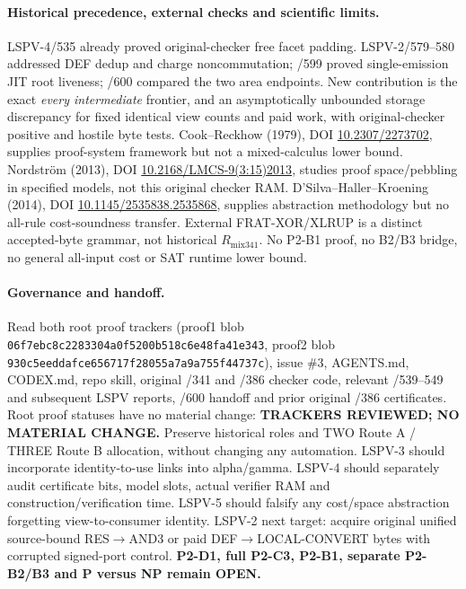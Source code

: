 \documentclass[11pt]{article}
\begin{document}
\paragraph{Historical precedence, external checks and scientific limits.}
LSPV-4/535 already proved original-checker free facet padding. LSPV-2/579--580 addressed DEF dedup and charge noncommutation; /599 proved single-emission JIT root liveness; /600 compared the two area endpoints. New contribution is the exact \emph{every intermediate} frontier, and an asymptotically unbounded storage discrepancy for fixed identical view counts and paid work, with original-checker positive and hostile byte tests. Cook--Reckhow (1979), DOI \href{https://doi.org/10.2307/2273702}{10.2307/2273702}, supplies proof-system framework but not a mixed-calculus lower bound. Nordstr\"om (2013), DOI \href{https://doi.org/10.2168/LMCS-9(3:15)2013}{10.2168/LMCS-9(3:15)2013}, studies proof space/pebbling in specified models, not this original checker RAM. D'Silva--Haller--Kroening (2014), DOI \href{https://doi.org/10.1145/2535838.2535868}{10.1145/2535838.2535868}, supplies abstraction methodology but no all-rule cost-soundness transfer. External FRAT-XOR/XLRUP is a distinct accepted-byte grammar, not historical $R_{\mathrm{mix341}}$. No P2-B1 proof, no B2/B3 bridge, no general all-input cost or SAT runtime lower bound.

\paragraph{Governance and handoff.}
Read both root proof trackers (proof1 blob \texttt{06f7ebc8c2283304a0f5200b518c6e48fa41e343}, proof2 blob \texttt{930c5eeddafce656717f28055a7a9a755f44737c}), issue \#3, AGENTS.md, CODEX.md, repo skill, original /341 and /386 checker code, relevant /539--549 and subsequent LSPV reports, /600 handoff and prior original /386 certificates. Root proof statuses have no material change: \textbf{TRACKERS REVIEWED; NO MATERIAL CHANGE.} Preserve historical roles and TWO Route A / THREE Route B allocation, without changing any automation. LSPV-3 should incorporate identity-to-use links into alpha/gamma. LSPV-4 should separately audit certificate bits, model slots, actual verifier RAM and construction/verification time. LSPV-5 should falsify any cost/space abstraction forgetting view-to-consumer identity. LSPV-2 next target: acquire original unified source-bound RES$\to$AND3 or paid DEF$\to$LOCAL-CONVERT bytes with corrupted signed-port control. \textbf{P2-D1, full P2-C3, P2-B1, separate P2-B2/B3 and P versus NP remain OPEN.}
\end{document}
